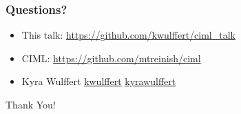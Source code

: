 \documentclass[aspectratio=169,11pt,hyperref={colorlinks=true}]{beamer}
\begin{document}

\begin{frame}
  \frametitle{Questions?}
  \begin{itemize}
    \item{This talk: \href{https://github.com/kwulffert/ciml\_talk}{https://github.com/kwulffert/ciml\_talk}}
    \item{CIML: \href{https://github.com/mtreinish/ciml}{https://github.com/mtreinish/ciml}}
  \end{itemize}
  \begin{itemize}
    \item Kyra Wulffert \faGithub \href{https://github.com/kwulffert/}{kwulffert} \faLinkedin \href{https://www.linkedin.com/in/kyrawulffert/}{kyrawulffert}
  \end{itemize}

\end{frame}

\begin{centraldark}{Thank You!}\end{centraldark}
\end{document}
